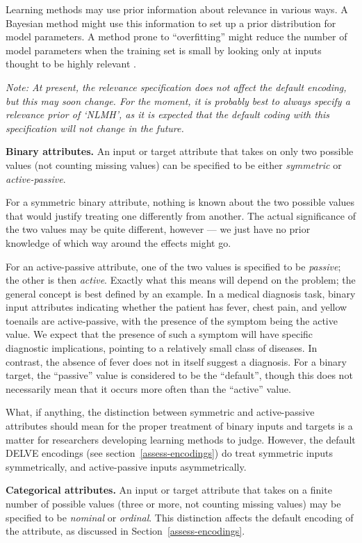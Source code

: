 Learning methods may use prior information about relevance in various
ways.  A Bayesian method might use this information to set up a prior
distribution for model parameters.  A method prone to ``overfitting''
might reduce the number of model parameters when the training set is
small by looking only at inputs thought to be highly relevant .

{\em Note: At present, the relevance specification does not affect the
default encoding, but this may soon change.  For the moment, it is
probably best to always specify a relevance prior of `NLMH', as it
is expected that the default coding with this specification will not
change in the future.}

{\bf Binary attributes.\/} An input or target attribute that takes on
only two possible values (not counting missing values) can be
specified to be either {\em symmetric\/} or {\em active-passive}.  

For a symmetric binary attribute, nothing is known about the two
possible values that would justify treating one differently from
another.  The actual significance of the two values may be quite
different, however --- we just have no prior knowledge of which way
around the effects might go.

For an active-passive attribute, one of the two values is specified to
be \emph{passive}; the other is then \emph{active}.  Exactly what this
means will depend on the problem; the general concept is best defined
by an example.  In a medical diagnosis task, binary input attributes
indicating whether the patient has fever, chest pain, and yellow
toenails are active-passive, with the presence of the symptom being
the active value.  We expect that the presence of such a symptom will
have specific diagnostic implications, pointing to a relatively small
class of diseases.  In contrast, the absence of fever does not in
itself suggest a diagnosis.  For a binary target, the ``passive''
value is considered to be the ``default'', though this does not
necessarily mean that it occurs more often than the ``active'' value.

What, if anything, the distinction between symmetric and
active-passive attributes should mean for the proper treatment of
binary inputs and targets is a matter for researchers developing
learning methods to judge.  However, the default DELVE encodings
(see section~\ref{assess-encodings}) do treat symmetric inputs
symmetrically, and active-passive inputs asymmetrically.

{\bf Categorical attributes.\/} An input or target attribute that
takes on a finite number of possible values (three or more, not
counting missing values) may be specified to be \emph{nominal} or
\emph{ordinal}.  This distinction affects the default encoding
of the attribute, as discussed in Section~\ref{assess-encodings}.


